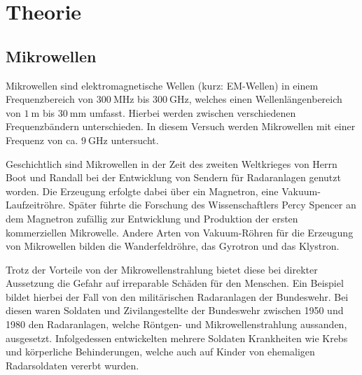 %
%
    \section{Theorie}
        \subsection{Mikrowellen}
            Mikrowellen sind elektromagnetische Wellen (kurz: EM-Wellen) in einem Frequenzbereich von $\SI{300}{\mega\hertz}$ bis $\SI{300}{\giga\hertz}$,
            welches einen Wellenlängenbereich von $\SI{1}{\meter}$ bis $\SI{30}{\milli\meter}$ umfasst.            
            Hierbei werden zwischen verschiedenen Frequenzbändern unterschieden. In diesem Versuch werden Mikrowellen mit einer Frequenz von ca. $\SI{9}{\giga\hertz}$ untersucht.
            
            Geschichtlich sind Mikrowellen in der Zeit des zweiten Weltkrieges von Herrn Boot und Randall bei der Entwicklung von Sendern für Radaranlagen genutzt worden.
            Die Erzeugung erfolgte dabei über ein Magnetron, eine Vakuum-Laufzeitröhre. Später führte die Forschung des Wissenschaftlers Percy Spencer an dem Magnetron zufällig zur
            Entwicklung und Produktion der ersten kommerziellen Mikrowelle. Andere Arten von Vakuum-Röhren für die Erzeugung 
            von Mikrowellen bilden die Wanderfeldröhre, das Gyrotron und das Klystron.
            
            Trotz der Vorteile von der Mikrowellenstrahlung bietet diese bei direkter Aussetzung
            die Gefahr auf irreparable Schäden für den Menschen. Ein Beispiel bildet hierbei der Fall von den militärischen
            Radaranlagen der Bundeswehr. Bei diesen waren Soldaten und Zivilangestellte der Bundeswehr zwischen 1950 und 1980 den Radaranlagen, welche
            Röntgen- und Mikrowellenstrahlung aussanden, ausgesetzt. Infolgedessen entwickelten mehrere Soldaten Krankheiten wie Krebs und körperliche Behinderungen,
            welche auch auf Kinder von ehemaligen Radarsoldaten vererbt wurden. 
            
